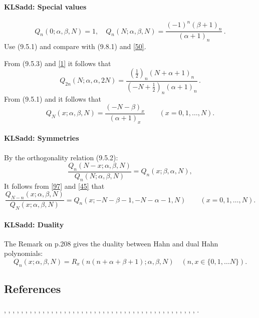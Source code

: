 \documentclass[envcountchap,graybox]{svmono}
\newcounter{rom}
\newcommand\al\alpha
\newcommand\be\beta
\newcommand\thalf{\tfrac12}
\begin{document}
\paragraph{\large\bf KLSadd: Special values}\begin{equation}
Q_n(0;\al,\be,N)=1,\quad
Q_n(N;\al,\be,N)=\frac{(-1)^n(\be+1)_n}{(\al+1)_n}\,.
\label{95}
\end{equation}
Use (9.5.1) and compare with (9.8.1) and \eqref{50}.

From (9.5.3) and \eqref{1} it follows that
\begin{equation}
Q_{2n}(N;\al,\al,2N)=\frac{(\thalf)_n(N+\al+1)_n}{(-N+\thalf)_n(\al+1)_n}\,.
\label{30}
\end{equation}
From (9.5.1) and  it follows that
\begin{equation}
Q_N(x;\al,\be,N)=\frac{(-N-\be)_x}{(\al+1)_x}\qquad(x=0,1,\ldots,N).
\label{44}
\end{equation}
%
\paragraph{\large\bf KLSadd: Symmetries}By the orthogonality relation (9.5.2):
\begin{equation}
\frac{Q_n(N-x;\al,\be,N)}{Q_n(N;\al,\be,N)}=Q_n(x;\be,\al,N),
\label{96}
\end{equation}
It follows from \eqref{97} and \eqref{45} that
\begin{equation}
\frac{Q_{N-n}(x;\al,\be,N)}{Q_N(x;\al,\be,N)}
=Q_n(x;-N-\be-1,-N-\al-1,N)
\qquad(x=0,1,\ldots,N).
\label{100}
\end{equation}
%
\paragraph{\large\bf KLSadd: Duality}The Remark on p.208 gives the duality between Hahn and dual Hahn polynomials:
%
\begin{equation}
Q_n(x;\al,\be,N)=R_x(n(n+\al+\be+1);\al,\be,N)\quad(n,x\in\{0,1,\ldots N\}).
\label{45}
\end{equation}
%
\subsection*{References}
\cite{AlSalam90}, \cite{AndrewsAskey85}, \cite{Area+II}, \cite{Askey75},
\cite{Askey89I}, \cite{Askey2005}, \cite{AskeyGasper77}, \cite{AskeyWilson85},
\cite{AtakRahmanSuslov}, \cite{AtakSuslov88}, \cite{Chihara78},
\cite{Ciesielski}, \cite{Cooper+}, \cite{Dette95}, \cite{Dunkl76},
\cite{Dunkl78I}, \cite{Gasper73I}, \cite{Gasper74}, \cite{HoareRahman},
\cite{Ismail77}, \cite{Ismail2005II}, \cite{Karlin61}, \cite{Koorn81}, \cite{Koorn88},
\cite{LabelleYehI}, \cite{LabelleYehII}, \cite{Laine}, \cite{Lesky62},
\cite{Lesky88}, \cite{Lesky89}, \cite{Lesky94I}, \cite{Lesky95II},
\cite{LewanowiczII}, \cite{Neuman}, \cite{Nikiforov+}, \cite{NikiforovUvarov},
\cite{Rahman76III}, \cite{Rahman78I}, \cite{Rahman78II}, \cite{Rahman81III},
\cite{Sablonniere}, \cite{Stanton84}, \cite{Stanton90}, \cite{Wilson80}, \cite{Wilson70II},
\cite{Zarzo+}.
\end{document}
